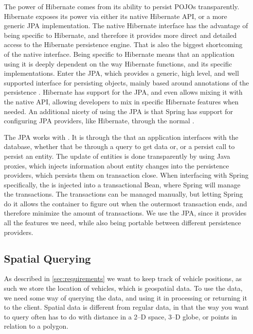 The power of Hibernate comes from its ability to persist \acp{POJO} transparently.
Hibernate exposes its power via either its native Hibernate API, or a more generic \ac{JPA} implementation.
The native Hibernate interface has the advantage of being specific to Hibernate, and therefore it provides more direct and detailed access to the Hibernate persistence engine.
That is also the biggest shortcoming of the native interface.
Being specific to Hibernate means that an application using it is deeply dependent on the way Hibernate functions, and its specific implementations.
Enter the \ac{JPA}, which provides a generic, high level, and well supported interface for persisting objects, mainly based around annotations of the persistence .
Hibernate has support for the \ac{JPA}, and even allows mixing it with the native API, allowing developers to mix in specific Hibernate features when needed.
An additional nicety of using the \ac{JPA} is that Spring has support for configuring \ac{JPA} providers, like Hibernate, through the normal .

The \ac{JPA} works with .
It is through the  that an application interfaces with the database, whether that be through a query to get data or, or a persist call to persist an entity.
The update of entities is done transparently by using Java proxies, which injects information about entity changes into the persistence providers, which persists them on transaction close.
When interfacing with Spring specifically, the  is injected into a transactional Bean, where Spring will manage the transactions.
The transactions can be managed manually, but letting Spring do it allows the container to figure out when the outermost transaction ends, and therefore minimize the amount of transactions.
We use the \ac{JPA}, since it provides all the features we need, while also being portable between different persistence providers.

\subsection{Spatial Querying}\label{subsubsec:spatialqueringtech}
As described in \cref{sec:requirements} we want to keep track of vehicle positions, as such we store the location of vehicles, which is geospatial data.
To use the data, we need some way of querying the data, and using it in processing or returning it to the client.
Spatial data is different from regular data, in that the way you want to query often has to do with distance in a 2--D space, 3--D globe, or points in relation to a polygon.

